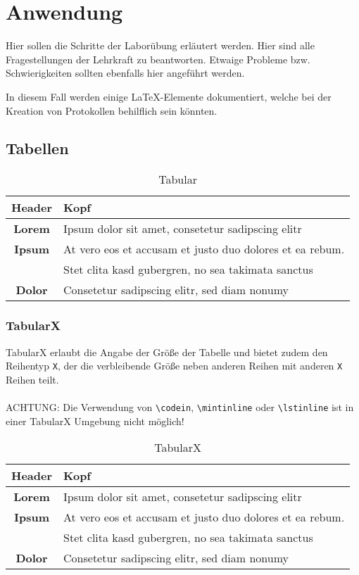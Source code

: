 \newpage
\section{Anwendung}\label{sec:Anwendung}
Hier sollen die Schritte der Laborübung erläutert werden. Hier sind alle Fragestellungen der Lehrkraft zu beantworten. Etwaige Probleme bzw. Schwierigkeiten sollten ebenfalls hier angeführt werden.

In diesem Fall werden einige \LaTeX-Elemente dokumentiert, welche bei der Kreation von Protokollen behilflich sein könnten.

\subsection{Tabellen}
\begin{table}[H]
	\center
	\begin{tabular}{| c | l |}
		\hline Header 	& Kopf\\ \hline\hline
		\textbf{Lorem} 	& Ipsum dolor sit amet, consetetur sadipscing elitr\\ \hline
		\textbf{Ipsum} 	& At vero eos et accusam et justo duo dolores et ea rebum.\\
						& Stet clita kasd gubergren, no sea takimata sanctus\\ \hline
		\textbf{Dolor} 	& Consetetur sadipscing elitr, sed diam nonumy\\\hline
	\end{tabular}
	\caption{Tabular}
	\label{tab:tabular}
\end{table}

\subsubsection{TabularX}
TabularX erlaubt die Angabe der Größe der Tabelle und bietet zudem den Reihentyp \texttt{X}, der die verbleibende Größe neben anderen Reihen mit anderen \texttt{X} Reihen teilt.
\\\\
ACHTUNG: Die Verwendung von \verb|\codein|, \verb|\mintinline| oder \verb|\lstinline| ist in einer TabularX Umgebung nicht möglich!
\begin{table}
    \center
    \begin{tabularx}{\textwidth}{| c | X |}
        \hline Header 	& Kopf\\ \hline\hline
        \textbf{Lorem} 	& Ipsum dolor sit amet, consetetur sadipscing elitr\\ \hline
        \textbf{Ipsum} 	& At vero eos et accusam et justo duo dolores et ea rebum.\\
            			& Stet clita kasd gubergren, no sea takimata sanctus\\ \hline
        \textbf{Dolor} 	& Consetetur sadipscing elitr, sed diam nonumy\\\hline
    \end{tabularx}
    \caption{TabularX}
    \label{tab:tabularx}
\end{table}

